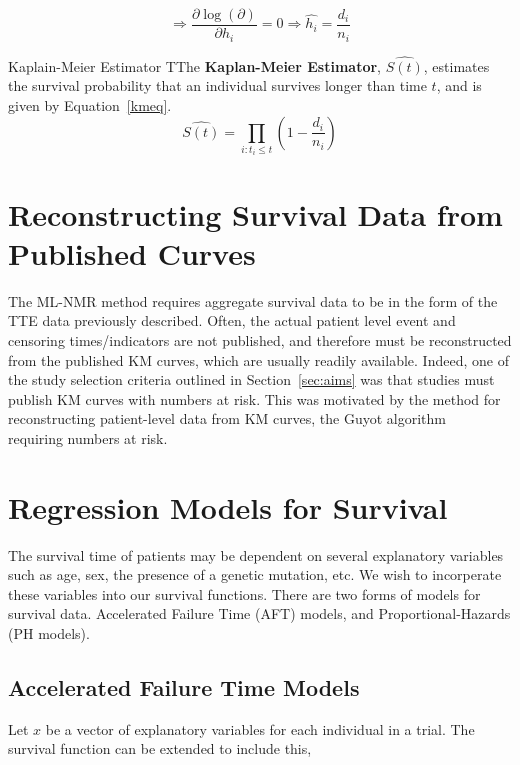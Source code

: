 \begin{equation}
    \Rightarrow \frac{\partial \log (\partial )}{\partial h_i} = 0 \Rightarrow \hat{h_i} = \frac{d_i}{n_i}
    \label{kmHaz}
\end{equation}

\begin{definition}{Kaplain-Meier Estimator}
    TThe \textbf{Kaplan-Meier Estimator}, $\hat{S(t)}$, estimates the survival probability that an individual survives longer than time $t$, and is given by Equation~\ref{kmeq}. 
\begin{equation}
    \hat{S(t)} = \prod_{i:t_i \leq t}\left(1 - \frac{d_i}{n_i}\right)
    \label{kmeq}
\end{equation}
\end{definition}

\section{Reconstructing Survival Data from Published Curves}
The ML-NMR method requires aggregate survival data to be in the form of the TTE data previously described. Often, the actual patient level event and censoring times/indicators are not published, and therefore must be reconstructed from the published KM curves, which are usually readily available. Indeed, one of the study selection criteria outlined in Section~\ref{sec:aims} was that studies must publish KM curves with numbers at risk. This was motivated by the method for reconstructing patient-level data from KM curves, the Guyot algorithm~\cite{guyotipd} requiring numbers at risk.

\section{Regression Models for Survival}

The survival time of patients may be dependent on several explanatory variables such as age, sex, the presence of a genetic mutation, etc. We wish to incorperate these variables into our survival functions. There are two forms of models for survival data. Accelerated Failure Time (AFT) models, and Proportional-Hazards (PH models).

\subsection{Accelerated Failure Time Models}

Let $x$ be a vector of explanatory variables for each individual in a trial. The survival function can be extended to include this,


